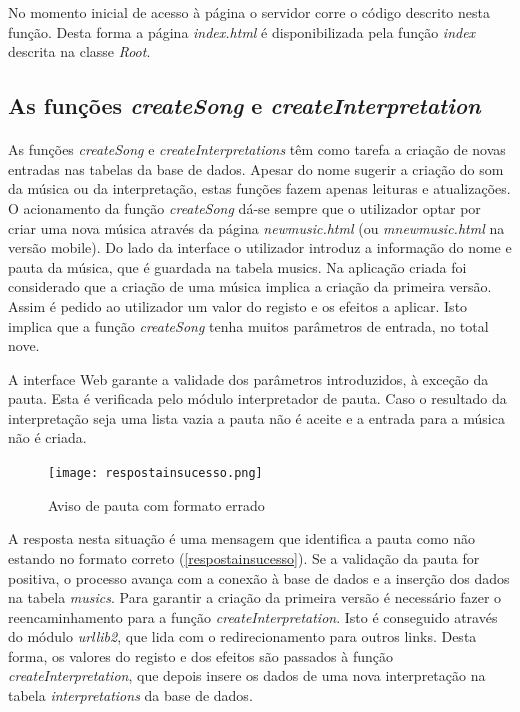 \documentclass[11pt,openany,twoside]{report}
\begin{document}
No momento inicial de acesso à página o servidor corre o código descrito nesta função. Desta forma a página \textit{index.html} é disponibilizada pela função \textit{index} descrita na classe \textit{Root}. 

\subsection{As funções \textit{createSong} e \textit{createInterpretation}}
\paragraph{ }As funções \textit{createSong} e \textit{createInterpretations} têm como tarefa a criação de novas entradas nas tabelas da base de dados. Apesar do nome sugerir a criação do som da música ou da interpretação, estas funções fazem apenas leituras e atualizações. O acionamento da função \textit{createSong} dá-se sempre que o utilizador optar por criar uma nova música através da página \textit{newmusic.html} (ou \textit{mnewmusic.html} na versão mobile). Do lado da interface o utilizador introduz a informação do nome e pauta da música, que é guardada na tabela musics. Na aplicação criada foi considerado que a criação de uma música implica a criação da primeira versão. Assim é pedido ao utilizador um valor do registo e os efeitos a aplicar. Isto implica que a função \textit{createSong} tenha muitos parâmetros de entrada, no total nove.

A interface Web garante a validade dos parâmetros introduzidos, à exceção da pauta. Esta é verificada pelo módulo interpretador de pauta. Caso o resultado da interpretação seja uma lista vazia a pauta não é aceite e a entrada para a música não é criada. 

\begin{figure}[h!]
 \center
 \texttt{[image: respostainsucesso.png]}
 \caption{Aviso de pauta com formato errado}
 \label{respostainsucesso}
\end{figure}
A resposta nesta situação é uma mensagem que identifica a pauta como não estando no formato correto (\autoref{respostainsucesso}). Se a validação da pauta for positiva, o processo avança com a conexão à base de dados  e a inserção dos dados na tabela \textit{musics}. Para garantir a criação da primeira versão é necessário fazer o reencaminhamento para a função \textit{createInterpretation}. Isto é conseguido através do módulo \textit{urllib2}, que lida com o redirecionamento para outros links. Desta forma, os valores do registo e dos efeitos são passados à função \textit{createInterpretation}, que depois insere os dados de uma nova interpretação na tabela \textit{interpretations} da base de dados. 
\end{document}
